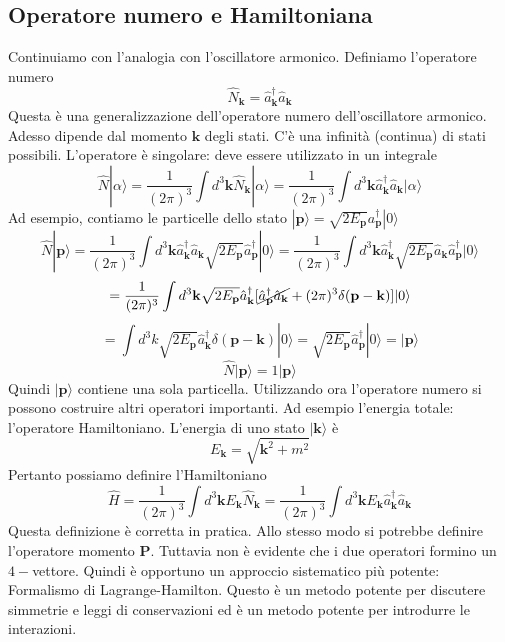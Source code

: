 \subsection{Operatore numero e Hamiltoniana}
Continuiamo con l'analogia con l'oscillatore armonico. Definiamo l'operatore numero
$$
\hat{N}_\mathbf{k} = \hat{a}_\mathbf{k}^\dagger \hat{a}_\mathbf{k}
$$
Questa è una generalizzazione dell'operatore numero dell'oscillatore armonico. Adesso dipende dal momento $\mathbf{k}$ degli stati. C'è una infinità (continua) di stati possibili. L'operatore è singolare: deve essere utilizzato in un integrale
$$
\hat{N} |\alpha\rangle = \frac{1}{(2\pi)^3} \int d^3\mathbf{k} \hat{N}_\mathbf{k} |\alpha\rangle = \frac{1}{(2\pi)^3} \int d^3\mathbf{k} \hat{a}_\mathbf{k}^\dagger \hat{a}_\mathbf{k} |\alpha\rangle
$$
Ad esempio, contiamo le particelle dello stato $|\mathbf{p}\rangle=\sqrt{2E_\mathbf{p}}a_\mathbf{p}^\dagger|0\rangle$
$$
\hat{N} |\mathbf{p}\rangle = \frac{1}{(2\pi)^3} \int d^3\mathbf{k} \hat{a}_\mathbf{k}^\dagger \hat{a}_\mathbf{k} \sqrt{2E_\mathbf{p}} \hat{a}_\mathbf{p}^\dagger |0\rangle = \frac{1}{(2\pi)^3} \int d^3\mathbf{k} \hat{a}_\mathbf{k}^\dagger \sqrt{2E_\mathbf{p}} \hat{a}_\mathbf{k} \hat{a}_\mathbf{p}^\dagger |0\rangle
$$
$$
= \frac{1}{(2\pi)^3} \int d^3\mathbf{k} \sqrt{2E_\mathbf{p}} \hat{a}_\mathbf{k}^\dagger [\cancel{\hat{a}_\mathbf{p}^\dagger \hat{a}_\mathbf{k}} + (2\pi)^3 \delta(\mathbf{p} - \mathbf{k})] |0\rangle
$$
$$
= \int d^3k \sqrt{2E_\mathbf{p}} \hat{a}_\mathbf{k}^\dagger \delta(\mathbf{p} - \mathbf{k}) |0\rangle = \sqrt{2E_\mathbf{p}} \hat{a}_\mathbf{p}^\dagger |0\rangle = |\mathbf{p}\rangle
$$
$$
\hat{N} |\mathbf{p}\rangle = 1 |\mathbf{p}\rangle
$$
Quindi $|\mathbf{p}\rangle$ contiene una sola particella. Utilizzando ora l'operatore numero si possono costruire altri operatori importanti. Ad esempio l'energia totale: l'operatore Hamiltoniano. L'energia di uno stato $|\mathbf{k}\rangle$ è
$$
E_\mathbf{k}=\sqrt{\mathbf{k}^2+m^2} 
$$
Pertanto possiamo definire l'Hamiltoniano
$$
\hat{H} = \frac{1}{(2\pi)^3} \int d^3\mathbf{k} E_\mathbf{k} \hat{N}_\mathbf{k} = \frac{1}{(2\pi)^3} \int d^3\mathbf{k} E_\mathbf{k} \hat{a}_\mathbf{k}^\dagger \hat{a}_\mathbf{k}
$$
Questa definizione è corretta in pratica. Allo stesso modo si potrebbe definire l'operatore momento $\mathbf{P}$. Tuttavia non è evidente che i due operatori formino un $4-$vettore. Quindi è opportuno un approccio sistematico più potente: Formalismo di Lagrange-Hamilton. Questo è un metodo potente per discutere simmetrie e leggi di conservazioni ed è un metodo potente per introdurre le interazioni.
